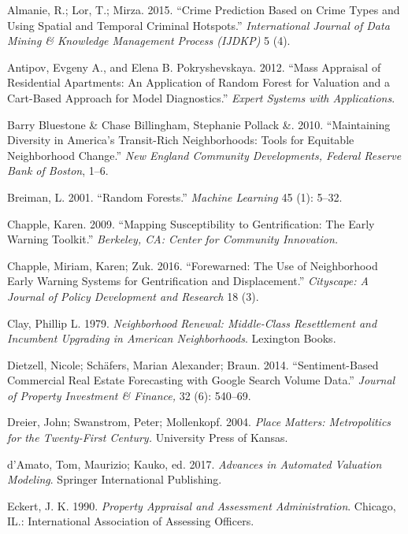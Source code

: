 \documentclass[]{article}
\begin{document}
\hypertarget{refs}{}
\hypertarget{ref-Almanie2015}{}
Almanie, R.; Lor, T.; Mirza. 2015. ``Crime Prediction Based on Crime
Types and Using Spatial and Temporal Criminal Hotspots.''
\emph{International Journal of Data Mining \& Knowledge Management
Process (IJDKP)} 5 (4).

\hypertarget{ref-antipov12}{}
Antipov, Evgeny A., and Elena B. Pokryshevskaya. 2012. ``Mass Appraisal
of Residential Apartments: An Application of Random Forest for Valuation
and a Cart-Based Approach for Model Diagnostics.'' \emph{Expert Systems
with Applications}.

\hypertarget{ref-Pollack2010}{}
Barry Bluestone \& Chase Billingham, Stephanie Pollack \&. 2010.
``Maintaining Diversity in America's Transit-Rich Neighborhoods: Tools
for Equitable Neighborhood Change.'' \emph{New England Community
Developments, Federal Reserve Bank of Boston}, 1--6.

\hypertarget{ref-Breiman2001}{}
Breiman, L. 2001. ``Random Forests.'' \emph{Machine Learning} 45 (1):
5--32.

\hypertarget{ref-Chapple2009}{}
Chapple, Karen. 2009. ``Mapping Susceptibility to Gentrification: The
Early Warning Toolkit.'' \emph{Berkeley, CA: Center for Community
Innovation.}

\hypertarget{ref-Chapple2016}{}
Chapple, Miriam, Karen; Zuk. 2016. ``Forewarned: The Use of Neighborhood
Early Warning Systems for Gentrification and Displacement.''
\emph{Cityscape: A Journal of Policy Development and Research} 18 (3).

\hypertarget{ref-Clay1979}{}
Clay, Phillip L. 1979. \emph{Neighborhood Renewal: Middle-Class
Resettlement and Incumbent Upgrading in American Neighborhoods}.
Lexington Books.

\hypertarget{ref-Dietzell2014}{}
Dietzell, Nicole; Schäfers, Marian Alexander; Braun. 2014.
``Sentiment-Based Commercial Real Estate Forecasting with Google Search
Volume Data.'' \emph{Journal of Property Investment \& Finance,} 32 (6):
540--69.

\hypertarget{ref-Dreier2004}{}
Dreier, John; Swanstrom, Peter; Mollenkopf. 2004. \emph{Place Matters:
Metropolitics for the Twenty-First Century.} University Press of Kansas.

\hypertarget{ref-Springer2017}{}
d'Amato, Tom, Maurizio; Kauko, ed. 2017. \emph{Advances in Automated
Valuation Modeling}. Springer International Publishing.

\hypertarget{ref-Eckert1990}{}
Eckert, J. K. 1990. \emph{Property Appraisal and Assessment
Administration}. Chicago, IL.: International Association of Assessing
Officers.
\end{document}
